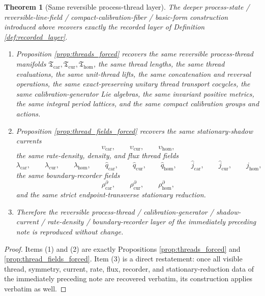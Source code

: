 \documentclass[11pt]{article}
\newcommand{\TensorThreadClass}{\mathfrak T_{\mathrm{car}}}
\newcommand{\CurThreadClass}{\mathfrak T_{\mathrm{cur}}}
\newcommand{\HomThreadClass}{\mathfrak T_{\mathrm{hom}}}
\newcommand{\TensorShadowDensity}{\upsilon_{\mathrm{car}}}
\newcommand{\CurShadowDensity}{\upsilon_{\mathrm{cur}}}
\newcommand{\HomShadowDensity}{\upsilon_{\mathrm{hom}}}
\newcommand{\TensorRateDensity}{\lambda_{\mathrm{car}}}
\newcommand{\CurRateDensity}{\lambda_{\mathrm{cur}}}
\newcommand{\HomRateDensity}{\lambda_{\mathrm{hom}}}
\newcommand{\TensorDensityField}{\widehat q_{\mathrm{car}}}
\newcommand{\CurDensityField}{\widehat q_{\mathrm{cur}}}
\newcommand{\HomDensityField}{\widehat q_{\mathrm{hom}}}
\newcommand{\TensorFluxField}{\widehat j_{\mathrm{car}}}
\newcommand{\CurFluxField}{\widehat j_{\mathrm{cur}}}
\newcommand{\HomFluxField}{\widehat j_{\mathrm{hom}}}
\newcommand{\TensorBoundaryRecorder}{\rho_{\mathrm{car}}^{\partial}}
\newcommand{\CurBoundaryRecorder}{\rho_{\mathrm{cur}}^{\partial}}
\newcommand{\HomBoundaryRecorder}{\rho_{\mathrm{hom}}^{\partial}}
\newtheorem{theorem}{Theorem}
\begin{document}
\begin{theorem}[Same reversible process-thread layer]
\label{thm:same_thread_layer}
The deeper process-state / reversible-line-field / compact-calibration-fiber / basic-form construction introduced above recovers exactly the recorded layer of Definition \ref{def:recorded_layer}.
\begin{enumerate}
    \item Proposition \ref{prop:threads_forced} recovers the same reversible process-thread manifolds \(\TensorThreadClass,\CurThreadClass,\HomThreadClass\), the same thread lengths, the same thread evaluations, the same unit-thread lifts, the same concatenation and reversal operations, the same exact-preserving unitary thread transport cocycles, the same calibration-generator Lie algebras, the same invariant positive metrics, the same integral period lattices, and the same compact calibration groups and actions.
    \item Proposition \ref{prop:thread_fields_forced} recovers the same stationary-shadow currents
    \[
    \TensorShadowDensity,\qquad
    \CurShadowDensity,\qquad
    \HomShadowDensity,
    \]
    the same rate-density, density, and flux thread fields
    \[
    \TensorRateDensity,\qquad
    \CurRateDensity,\qquad
    \HomRateDensity,\qquad
    \TensorDensityField,\qquad
    \CurDensityField,\qquad
    \HomDensityField,\qquad
    \TensorFluxField,\qquad
    \CurFluxField,\qquad
    \HomFluxField,
    \]
    the same boundary-recorder fields
    \[
    \TensorBoundaryRecorder,\qquad
    \CurBoundaryRecorder,\qquad
    \HomBoundaryRecorder,
    \]
    and the same strict endpoint-transverse stationary reduction.
    \item Therefore the reversible process-thread / calibration-generator / shadow-current / rate-density / boundary-recorder layer of the immediately preceding note is reproduced without change.
\end{enumerate}
\end{theorem}

\begin{proof}
Items (1) and (2) are exactly Propositions \ref{prop:threads_forced} and \ref{prop:thread_fields_forced}. Item (3) is a direct restatement: once all visible thread, symmetry, current, rate, flux, recorder, and stationary-reduction data of the immediately preceding note are recovered verbatim, its construction applies verbatim as well.
\end{proof}
\end{document}

